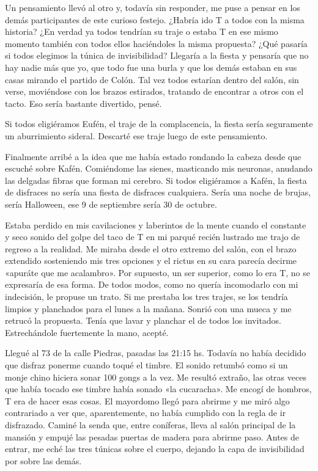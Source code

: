 \documentclass[11pt,twoside,openright,a5paper]{book}
\begin{document}
Un pensamiento llevó al otro y, todavía sin responder, me puse a pensar en los demás participantes de este curioso festejo. ¿Habría ido T a todos con la misma historia? ¿En verdad ya todos tendrían su traje o estaba T en ese mismo momento también con todos ellos haciéndoles la misma propuesta? ¿Qué pasaría si todos elegimos la túnica de invisibilidad? Llegaría a la fiesta y pensaría que no hay nadie más que yo, que todo fue una burla y que los demás estaban en sus casas mirando el partido de Colón. Tal vez todos estarían dentro del salón, sin verse, moviéndose con los brazos estirados, tratando de encontrar a otros con el tacto. Eso sería bastante divertido, pensé.

Si todos eligiéramos Eufén, el traje de la complacencia, la fiesta sería seguramente un aburrimiento sideral. Descarté ese traje luego de este pensamiento.

Finalmente arribé a la idea que me había estado rondando la cabeza desde que escuché sobre Kafén. Comiéndome las sienes, masticando mis neuronas, anudando las delgadas fibras que forman mi cerebro. Si todos eligiéramos a Kafén, la fiesta de disfraces no sería una fiesta de disfraces cualquiera. Sería una noche de brujas, sería Halloween, ese 9 de septiembre sería 30 de octubre.

Estaba perdido en mis cavilaciones y laberintos de la mente cuando el constante y seco sonido del golpe del taco de T en mi parqué recién lustrado me trajo de regreso a la realidad. Me miraba desde el otro extremo del salón, con el brazo extendido sosteniendo mis tres opciones y el rictus en su cara parecía decirme «apuráte que me acalambro». Por supuesto, un ser superior, como lo era T, no se expresaría de esa forma. De todos modos, como no quería incomodarlo con mi indecisión, le propuse un trato. Si me prestaba los tres trajes, se los tendría limpios y planchados para el lunes a la mañana. Sonrió con una mueca y me retrucó la propuesta. Tenía que lavar y planchar el de todos los invitados. Estrechándole fuertemente la mano, acepté.

Llegué al 73 de la calle Piedras, pasadas las 21:15 hs. Todavía no había decidido que disfraz ponerme cuando toqué el timbre. El sonido retumbó como si un monje chino hiciera sonar 100 gongs a la vez. Me resultó extraño, las otras veces que había tocado ese timbre había sonado «la cucaracha». Me encogí de hombros, T era de hacer esas cosas. El mayordomo llegó para abrirme y me miró algo contrariado a ver que, aparentemente, no había cumplido con la regla de ir disfrazado. Caminé la senda que, entre coníferas, lleva al salón principal de la mansión y empujé las pesadas puertas de madera para abrirme paso. Antes de entrar, me eché las tres túnicas sobre el cuerpo, dejando la capa de invisibilidad por sobre las demás. 
\end{document}
